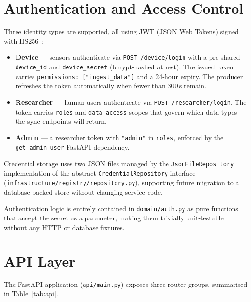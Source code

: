 \section{Authentication and Access Control}
\label{sec:auth}

Three identity types are supported, all using JWT (JSON Web Tokens)
signed with HS256~\cite{rfc7519}:

\begin{itemize}
  \item \textbf{Device} — sensors authenticate via \texttt{POST /device/login}
        with a pre-shared \texttt{device\_id} and \texttt{device\_secret}
        (bcrypt-hashed at rest).
        The issued token carries
        \texttt{permissions: ["ingest\_data"]} and a 24-hour expiry.
        The producer refreshes the token automatically when fewer than
        300\,s remain.
  \item \textbf{Researcher} — human users authenticate via
        \texttt{POST /researcher/login}.
        The token carries \texttt{roles} and \texttt{data\_access} scopes
        that govern which data types the sync endpoints will return.
  \item \textbf{Admin} — a researcher token with \texttt{"admin"} in
        \texttt{roles}, enforced by the \texttt{get\_admin\_user}
        FastAPI dependency.
\end{itemize}

Credential storage uses two JSON files managed by the
\texttt{JsonFileRepository} implementation of the abstract
\texttt{CredentialRepository} interface
(\texttt{infrastructure/registry/repository.py}), supporting future
migration to a database-backed store without changing service code.

Authentication logic is entirely contained in \texttt{domain/auth.py}
as pure functions that accept the secret as a parameter, making them
trivially unit-testable without any HTTP or database fixtures.

\section{API Layer}
\label{sec:api}

The FastAPI application (\texttt{api/main.py}) exposes three router groups,
summarised in Table~\ref{tab:api}.

